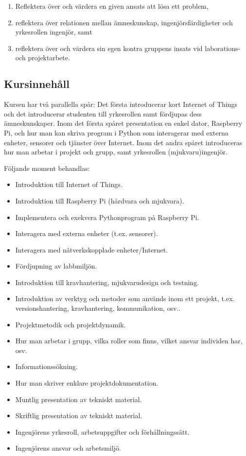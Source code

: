 \begin{enumerate}
  \begin{enumerate}
  \def\labelenumii{\Alph{enumi}.\arabic{enumii}.}
  \tightlist
  \item
    Reflektera över och värdera en given ansats att lösa ett problem,
  \item
    reflektera över relationen mellan ämneskunskap, ingenjörsfärdigheter
    och yrkesrollen ingenjör, samt
  \item
    reflektera över och värdera sin egen kontra gruppens insats vid
    laborations- och projektarbete.
  \end{enumerate}
\end{enumerate}

\subsection*{Kursinnehåll}

Kursen har två parallella spår: Det första introducerar kort Internet of
Things och det introducerar studenten till yrkesrollen samt fördjupas
dess ämneskunskaper. Inom det första spåret presentation en enkel dator,
Raspberry Pi, och hur man kan skriva program i Python som interagerar
med externa enheter, sensorer och tjänster över Internet. Inom det andra
spåret introduceras hur man arbetar i projekt och grupp, samt
yrkesrollen (mjukvaru)ingenjör.

Följande moment behandlas:

\begin{itemize}
\tightlist
\item
  Introduktion till Internet of Things.
\item
  Introduktion till Raspberry Pi (hårdvara och mjukvara).
\item
  Implementera och exekvera Pythonprogram på Raspberry Pi.
\item
  Interagera med externa enheter (t.ex. sensorer).
\item
  Interagera med nätverkskopplade enheter/Internet.
\item
  Fördjupning av labbmiljön.
\item
  Introduktion till kravhantering, mjukvarudesign och testning.
\item
  Introduktion av verktyg och metoder som används inom ett projekt,
  t.ex. versionshantering, kravhantering, kommunikation, osv..
\item
  Projektmetodik och projektdynamik.
\item
  Hur man arbetar i grupp, vilka roller som finns, vilket ansvar
  individen har, osv.
\item
  Informationssökning.
\item
  Hur man skriver enklare projektdokumentation.
\item
  Muntlig presentation av tekniskt material.
\item
  Skriftlig presentation av tekniskt material.
\item
  Ingenjörens yrkesroll, arbetsuppgifter och förhållningssätt.
\item
  Ingenjörens ansvar och arbetsmiljö.
\end{itemize}

